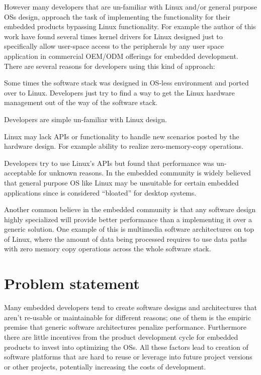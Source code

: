 However many developers that are un-familiar with Linux and/or general purpose \acp{OS} design, approach the task of implementing the functionality for their embedded products bypassing Linux functionality. For example the author of this work have found several times kernel drivers for Linux designed just to specifically allow user-space access to the peripherals by any user space application in commercial \ac{OEM}/\ac{ODM} offerings for embedded development.  There are several reasons for developers using this kind of approach:
\begin{itemize*}
\item Some times the software stack was designed in \ac{OS}-less environment and ported over to Linux. Developers just try to find a way to get the Linux hardware management out of the way of the software stack.
\item Developers are simple un-familiar with Linux design.
\item Linux may lack APIs or functionality to handle new scenarios posted by the hardware design. For example ability to realize zero-memory-copy operations.
\item Developers try to use Linux's APIs but found that performance was un-acceptable for unknown reasons. In the embedded community is widely believed that general purpose \ac{OS} like Linux may be unsuitable for certain embedded applications since is considered ``bloated'' for desktop systems.
\end{itemize*}

Another common believe in the embedded community is that any software design highly specialized will provide better performance than a implementing it over a generic solution. One example of this is multimedia software architectures on top of Linux, where the amount of data being processed requires to use data paths with zero memory copy operations across the whole software stack.
 
\section{Problem statement}
Many embedded developers tend to create software designs and architectures that aren't re-usable or maintainable for different reasons; one of them is the empiric premise that generic software architectures penalize performance. Furthermore there are little incentives from the product development cycle for embedded products to invest into optimizing the \acp{OS}. All these factors lead to creation of software platforms that are hard to reuse or leverage into future project versions or other projects, potentially increasing the costs of development.

